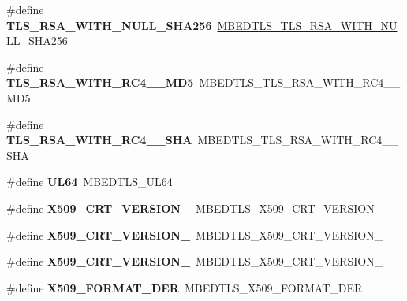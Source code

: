 \begin{DoxyCompactItemize}
\item 
\mbox{\label{compat-1_83_8h_ae388fc0dbac04b3d5717fd447eaec61d}} 
\#define {\bfseries T\+L\+S\+\_\+\+R\+S\+A\+\_\+\+W\+I\+T\+H\+\_\+\+N\+U\+L\+L\+\_\+\+S\+H\+A256}~\mbox{\hyperlink{ssl__ciphersuites_8h_a788470161a09d2200ad462a557db2c1f}{M\+B\+E\+D\+T\+L\+S\+\_\+\+T\+L\+S\+\_\+\+R\+S\+A\+\_\+\+W\+I\+T\+H\+\_\+\+N\+U\+L\+L\+\_\+\+S\+H\+A256}}
\item 
\mbox{\label{compat-1_83_8h_a29697092bb88cacb9c5306be52beeefc}} 
\#define {\bfseries T\+L\+S\+\_\+\+R\+S\+A\+\_\+\+W\+I\+T\+H\+\_\+\+R\+C4\+\_\+\_\+\+M\+D5}~M\+B\+E\+D\+T\+L\+S\+\_\+\+T\+L\+S\+\_\+\+R\+S\+A\+\_\+\+W\+I\+T\+H\+\_\+\+R\+C4\+\_\+\_\+\+M\+D5
\item 
\mbox{\label{compat-1_83_8h_aba17cf5182609e28dca3c493ac066734}} 
\#define {\bfseries T\+L\+S\+\_\+\+R\+S\+A\+\_\+\+W\+I\+T\+H\+\_\+\+R\+C4\+\_\+\_\+\+S\+HA}~M\+B\+E\+D\+T\+L\+S\+\_\+\+T\+L\+S\+\_\+\+R\+S\+A\+\_\+\+W\+I\+T\+H\+\_\+\+R\+C4\+\_\+\_\+\+S\+HA
\item 
\mbox{\label{compat-1_83_8h_a72debc8d53da8731673da89e064d4e34}} 
\#define {\bfseries U\+L64}~M\+B\+E\+D\+T\+L\+S\+\_\+\+U\+L64
\item 
\mbox{\label{compat-1_83_8h_a803eb771dce23b32e873b94fa42ae3eb}} 
\#define {\bfseries X509\+\_\+\+C\+R\+T\+\_\+\+V\+E\+R\+S\+I\+O\+N\+\_}~M\+B\+E\+D\+T\+L\+S\+\_\+\+X509\+\_\+\+C\+R\+T\+\_\+\+V\+E\+R\+S\+I\+O\+N\+\_
\item 
\mbox{\label{compat-1_83_8h_aff0395a0a007c3515967f958879926cf}} 
\#define {\bfseries X509\+\_\+\+C\+R\+T\+\_\+\+V\+E\+R\+S\+I\+O\+N\+\_}~M\+B\+E\+D\+T\+L\+S\+\_\+\+X509\+\_\+\+C\+R\+T\+\_\+\+V\+E\+R\+S\+I\+O\+N\+\_
\item 
\mbox{\label{compat-1_83_8h_a5aa7c22740f9d1271b76fe9dffe5ce18}} 
\#define {\bfseries X509\+\_\+\+C\+R\+T\+\_\+\+V\+E\+R\+S\+I\+O\+N\+\_}~M\+B\+E\+D\+T\+L\+S\+\_\+\+X509\+\_\+\+C\+R\+T\+\_\+\+V\+E\+R\+S\+I\+O\+N\+\_
\item 
\mbox{\label{compat-1_83_8h_a6ca31be06f89a3f5c8abc93654460a77}} 
\#define {\bfseries X509\+\_\+\+F\+O\+R\+M\+A\+T\+\_\+\+D\+ER}~M\+B\+E\+D\+T\+L\+S\+\_\+\+X509\+\_\+\+F\+O\+R\+M\+A\+T\+\_\+\+D\+ER

\end{DoxyCompactItemize}
